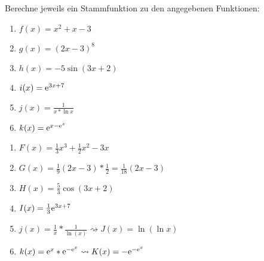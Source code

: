


 Berechne jeweils ein Stammfunktion zu den angegebenen Funktionen:
\begin{multicols}{3}
	\begin{enumerate}
		\item $f(x)=x^2+x-3$
		\item $g(x)=(2x-3)^8$
		\item $h(x)=-5\sin(3x+2)$
		\item $i(x)=\mathrm{e}^{3x+7}$
		\item $j(x)=\frac{1}{x*\ln x}$
		\item $k(x)=\mathrm{e}^{x-\mathrm{e}^x}$
	\end{enumerate}
\end{multicols}
\begin{lsg}{}
	\begin{multicols}{2}
		\begin{enumerate}
			\item $F(x)=\frac 1 3x^3+\frac 1 2 x^2-3x$
			\item $G(x)=\frac 1 9 (2x-3)*\frac 1 2=\frac{1}{18}(2x-3)$
			\item $H(x)=\frac 5 3 \cos(3x+2)$
			\item $I(x)=\frac 1 3 \mathrm{e}^{3x+7}$
			\item $j(x)=\frac 1 x*\frac{1}{\ln(x)}\rightsquigarrow J(x)=\ln(\ln x)$
			\item $k(x)=\mathrm{e}^x*\mathrm{e}^{-\mathrm{e}^x}\rightsquigarrow K(x)=-\mathrm{e}^{-\mathrm{e}^x}$
		\end{enumerate}
	\end{multicols}
\end{lsg}

\clearpage


